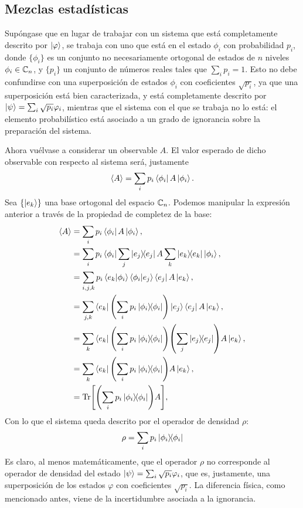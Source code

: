 \subsection{Mezclas estadísticas}

Supóngase que en lugar de trabajar con un sistema que está completamente descrito por $\ket{\varphi}$, se trabaja con uno que está en el estado $\phi_{i}$ con probabilidad $p_{i}$, donde $\{\phi_{i}\}$ es un conjunto no necesariamente ortogonal de estados de $n$ niveles $\phi_{i}\in\mathbb{C}_{n}$, y $\{p_{i}\}$ un conjunto de números reales tales que $\sum_{i}p_{i}=1$. Esto no debe confundirse con una superposición de estados $\phi_{i}$ con coeficientes $\sqrt{p_{i}}$, ya que una superposición está bien caracterizada, y está completamente descrito por $\ket{\psi}=\sum_{i}\sqrt{p_{i}}\varphi_{i}$, mientras que el sistema con el que se trabaja no lo está: el elemento probabilístico está asociado a un grado de ignorancia sobre la preparación del sistema.

Ahora vuélvase a considerar un observable $A$. El valor esperado de dicho observable con respecto al sistema será, justamente
\begin{equation}
\expval{A}=\sum_{i}p_{i}\bra{\phi_{i}}A\ket{\phi_{i}}.
\end{equation}
Sea $\{\ket{e_{k}}\}$ una base ortogonal del espacio $\mathbb{C}_{n}$. Podemos manipular la expresión anterior a través de la propiedad de completez de la base:
\begin{align*}
\expval{A}&=\sum_{i}p_{i}\bra{\phi_{i}}A\ket{\phi_{i}},\\
&=\sum_{i}p_{i}\bra{\phi_{i}}\sum_{j}\dyad{e_{j}}A\sum_{k}\dyad{e_{k}}\ket{\phi_{i}},\\
&=\sum_{i,j,k}p_{i}\bra{e_{k}}\ket{\phi_{i}}\bra{\phi_{i}}\ket{e_{j}} \bra{e_{j}}A\ket{e_{k}}, \\
&=\sum_{j,k}\bra{e_{k}}\qty(\sum_{i}p_{i}\dyad{\phi_{i}})\ket{e_{j}} \bra{e_{j}}A\ket{e_{k}}, \\
&=\sum_{k}\bra{e_{k}}\qty(\sum_{i}p_{i}\dyad{\phi_{i}})\qty(\sum_{j}\dyad{e_{j}})A\ket{e_{k}}, \\
&=\sum_{k}\bra{e_{k}}\qty(\sum_{i}p_{i}\dyad{\phi_{i}})A\ket{e_{k}}, \\
&=\Tr[\qty(\sum_{i}p_{i}\dyad{\phi_{i}})A], \\
\end{align*}
Con lo que el sistema queda descrito por el operador de densidad $\rho$:
\begin{equation}\label{eq:DensOpMix}
\rho=\sum_{i}p_{i}\dyad{\phi_{i}}
\end{equation}
Es claro, al menos matemáticamente, que el operador $\rho$ no corresponde al operador de densidad del estado $\ket{\psi}=\sum_{i}\sqrt{p_{i}}\varphi_{i}$, que es, justamente, una superposición de los estados $\varphi$ con coeficientes $\sqrt{p_{i}}$.  La diferencia física, como mencionado antes, viene de la incertidumbre asociada a la ignorancia.

